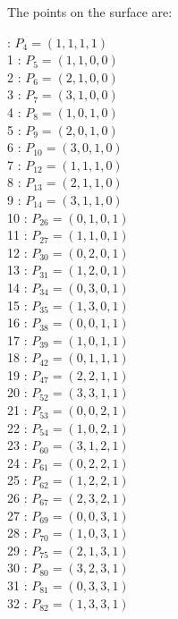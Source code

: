 \documentclass{article}
\begin{document}
{The points on the surface are:\\
\begin{multicols}{3}
 : $P_{4}=( 1, 1, 1, 1 )$\\
1 : $P_{5}=( 1, 1, 0, 0 )$\\
2 : $P_{6}=( 2, 1, 0, 0 )$\\
3 : $P_{7}=( 3, 1, 0, 0 )$\\
4 : $P_{8}=( 1, 0, 1, 0 )$\\
5 : $P_{9}=( 2, 0, 1, 0 )$\\
6 : $P_{10}=( 3, 0, 1, 0 )$\\
7 : $P_{12}=( 1, 1, 1, 0 )$\\
8 : $P_{13}=( 2, 1, 1, 0 )$\\
9 : $P_{14}=( 3, 1, 1, 0 )$\\
10 : $P_{26}=( 0, 1, 0, 1 )$\\
11 : $P_{27}=( 1, 1, 0, 1 )$\\
12 : $P_{30}=( 0, 2, 0, 1 )$\\
13 : $P_{31}=( 1, 2, 0, 1 )$\\
14 : $P_{34}=( 0, 3, 0, 1 )$\\
15 : $P_{35}=( 1, 3, 0, 1 )$\\
16 : $P_{38}=( 0, 0, 1, 1 )$\\
17 : $P_{39}=( 1, 0, 1, 1 )$\\
18 : $P_{42}=( 0, 1, 1, 1 )$\\
19 : $P_{47}=( 2, 2, 1, 1 )$\\
20 : $P_{52}=( 3, 3, 1, 1 )$\\
21 : $P_{53}=( 0, 0, 2, 1 )$\\
22 : $P_{54}=( 1, 0, 2, 1 )$\\
23 : $P_{60}=( 3, 1, 2, 1 )$\\
24 : $P_{61}=( 0, 2, 2, 1 )$\\
25 : $P_{62}=( 1, 2, 2, 1 )$\\
26 : $P_{67}=( 2, 3, 2, 1 )$\\
27 : $P_{69}=( 0, 0, 3, 1 )$\\
28 : $P_{70}=( 1, 0, 3, 1 )$\\
29 : $P_{75}=( 2, 1, 3, 1 )$\\
30 : $P_{80}=( 3, 2, 3, 1 )$\\
31 : $P_{81}=( 0, 3, 3, 1 )$\\
32 : $P_{82}=( 1, 3, 3, 1 )$\\
\end{multicols}


%


%


}%
\end{document}
